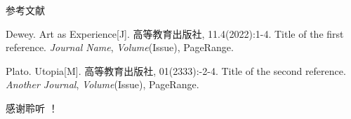 \documentclass[10pt,a4paper]{beamer} %
\begin{document}
	\appendix
	\begin{frame}{参考文献}
		\begin{thebibliography}{99} %
			Dewey. Art as Experience[J]. 高等教育出版社, 11.4(2022):1-4.
			\newblock Title of the first reference.
			\newblock \emph{Journal Name}, \emph{Volume}(Issue), PageRange.
			
			 Plato. Utopia[M]. 高等教育出版社, 01(2333):-2-4.
			\newblock Title of the second reference.
			\newblock \emph{Another Journal}, \emph{Volume}(Issue), PageRange.
		\end{thebibliography}
	\end{frame}
	
	\begin{frame}[plain,c]
		\begin{center}
			\Huge 感谢聆听 ！
		\end{center}
	\end{frame}
	
\end{document}
